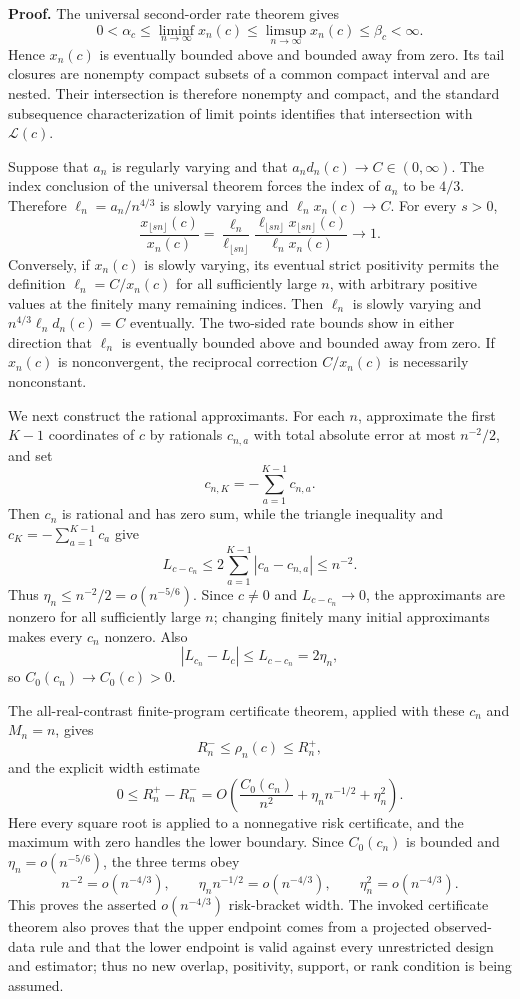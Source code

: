 \textbf{Proof.}
The universal second-order rate theorem gives
\[
 0<\alpha_c\leq\liminf_{n\to\infty}x_n(c)
 \leq\limsup_{n\to\infty}x_n(c)\leq\beta_c<\infty.
\]
Hence \(x_n(c)\) is eventually bounded above and bounded away from zero.  Its tail closures are nonempty compact subsets of a common compact interval and are nested.  Their intersection is therefore nonempty and compact, and the standard subsequence characterization of limit points identifies that intersection with \(\mathcal L(c)\).

Suppose that \(a_n\) is regularly varying and that \(a_nd_n(c)\to C\in(0,\infty)\).  The index conclusion of the universal theorem forces the index of \(a_n\) to be \(4/3\).  Therefore \(\ell_n=a_n/n^{4/3}\) is slowly varying and \(\ell_nx_n(c)\to C\).  For every \(s>0\),
\[
 \frac{x_{\lfloor sn\rfloor}(c)}{x_n(c)}
 =\frac{\ell_n}{\ell_{\lfloor sn\rfloor}}
 \frac{\ell_{\lfloor sn\rfloor}x_{\lfloor sn\rfloor}(c)}
 {\ell_nx_n(c)}\longrightarrow1.
\]
Conversely, if \(x_n(c)\) is slowly varying, its eventual strict positivity permits the definition \(\ell_n=C/x_n(c)\) for all sufficiently large \(n\), with arbitrary positive values at the finitely many remaining indices.  Then \(\ell_n\) is slowly varying and \(n^{4/3}\ell_nd_n(c)=C\) eventually.  The two-sided rate bounds show in either direction that \(\ell_n\) is eventually bounded above and bounded away from zero.  If \(x_n(c)\) is nonconvergent, the reciprocal correction \(C/x_n(c)\) is necessarily nonconstant.

We next construct the rational approximants.  For each \(n\), approximate the first \(K-1\) coordinates of \(c\) by rationals \(c_{n,a}\) with total absolute error at most \(n^{-2}/2\), and set
\[
 c_{n,K}=-\sum_{a=1}^{K-1}c_{n,a}.
\]
Then \(c_n\) is rational and has zero sum, while the triangle inequality and \(c_K=-\sum_{a=1}^{K-1}c_a\) give
\[
 L_{c-c_n}\leq
 2\sum_{a=1}^{K-1}|c_a-c_{n,a}|\leq n^{-2}.
\]
Thus \(\eta_n\leq n^{-2}/2=o(n^{-5/6})\).  Since \(c\neq0\) and \(L_{c-c_n}\to0\), the approximants are nonzero for all sufficiently large \(n\); changing finitely many initial approximants makes every \(c_n\) nonzero.  Also
\[
 |L_{c_n}-L_c|\leq L_{c-c_n}=2\eta_n,
\]
so \(C_0(c_n)\to C_0(c)>0\).

The all-real-contrast finite-program certificate theorem, applied with these \(c_n\) and \(M_n=n\), gives
\[
 R_n^-\leq\rho_n(c)\leq R_n^+,
\]
and the explicit width estimate
\[
 0\leq R_n^+-R_n^-
 =O\!\left(
 \frac{C_0(c_n)}{n^2}+\eta_nn^{-1/2}+\eta_n^2
 \right).
\]
Here every square root is applied to a nonnegative risk certificate, and the maximum with zero handles the lower boundary.  Since \(C_0(c_n)\) is bounded and \(\eta_n=o(n^{-5/6})\), the three terms obey
\[
 n^{-2}=o(n^{-4/3}),\qquad
 \eta_nn^{-1/2}=o(n^{-4/3}),\qquad
 \eta_n^2=o(n^{-4/3}).
\]
This proves the asserted \(o(n^{-4/3})\) risk-bracket width.  The invoked certificate theorem also proves that the upper endpoint comes from a projected observed-data rule and that the lower endpoint is valid against every unrestricted design and estimator; thus no new overlap, positivity, support, or rank condition is being assumed.

